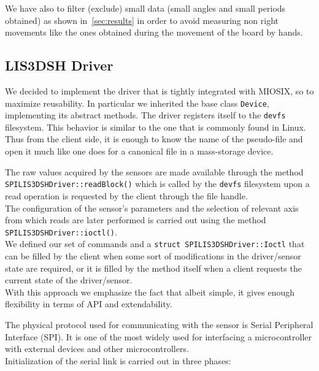 We have also to filter (exclude) small data (small angles and small periods obtained) as shown in~\ref{sec:results} in order  to avoid measuring non right movements like the ones obtained during the movement of the board by hands.

\subsection{LIS3DSH Driver}
We decided to implement the driver that is tightly integrated with MIOSIX, so to maximize reusability. In particular we inherited the base class \texttt{Device}, implementing its abstract methods. The driver registers itself to the \texttt{devfs} filesystem. This behavior is similar to the one that is commonly found in Linux. Thus from the client side, it is enough to know the name of the pseudo-file and open it much like one does for a canonical file in a mass-storage device.  \par The raw values acquired by the sensors are made available through the method \\ \texttt{SPILIS3DSHDriver::readBlock()} which is called by the \texttt{devfs} filesystem upon a read operation is requested by the client through the file handle. \\
The configuration of the sensor's parameters and the selection of relevant axis from which reads are later performed is carried out using the method \texttt{SPILIS3DSHDriver::ioctl()}. \\ We defined our set of commands and a \texttt{struct SPILIS3DSHDriver::Ioctl} that can be filled by the client when some sort of modifications in the driver/sensor state are required, or it is filled by the method itself when a client requests the current state of the driver/sensor. \\ With this approach we emphasize the fact that albeit simple, it gives enough flexibility in terms of API and extendability.
\par
The physical protocol used for communicating with the sensor is Serial Peripheral Interface \cite{accelerometerDatasheet}\cite{STM32F4RefMan}  (SPI). It is one of the most widely used for interfacing a microcontroller with external devices and other microcontrollers. \\  
Initialization of the serial link is carried out in three phases:
